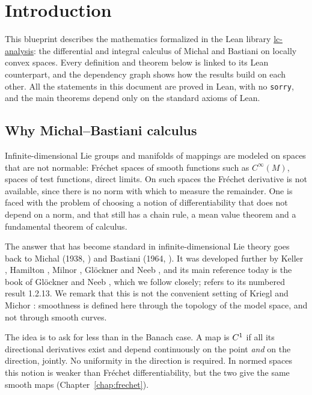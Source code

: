 \chapter{Introduction}
\label{chap:introduction}

This blueprint describes the mathematics formalized in the Lean library
\href{https://github.com/glaroton/lc-analysis}{lc-analysis}: the differential and integral
calculus of Michal and Bastiani on locally convex spaces. Every definition and theorem below is
linked to its Lean counterpart, and the dependency graph shows how the results build on each
other. All the statements in this document are proved in Lean, with no \texttt{sorry}, and the
main theorems depend only on the standard axioms of Lean.

\section*{Why Michal--Bastiani calculus}

Infinite-dimensional Lie groups and manifolds of mappings are modeled on spaces that are not
normable: Fréchet spaces of smooth functions such as $C^\infty(M)$, spaces of test functions,
direct limits. On such spaces the Fréchet derivative is not available, since there is no norm
with which to measure the remainder. One is faced with the problem of choosing a notion of
differentiability that does not depend on a norm, and that still has a chain rule, a mean value
theorem and a fundamental theorem of calculus.

The answer that has become standard in infinite-dimensional Lie theory goes back to Michal
(1938, \cite{Mic38}) and Bastiani (1964, \cite{Bas64}). It was developed further by Keller
\cite{Kel74}, Hamilton \cite{Ham82}, Milnor \cite{Mil84}, Glöckner \cite{Glo02} and Neeb
\cite{Nee06}, and its main reference today is the book of Glöckner and Neeb \cite{GN26}, which
we follow closely; \cite[1.2.13]{GN26} refers to its numbered result 1.2.13. We remark that
this is not the convenient setting of Kriegl and Michor \cite{KM97}: smoothness is defined here
through the topology of the model space, and not through smooth curves.

The idea is to ask for less than in the Banach case. A map is $C^{1}$ if all its directional
derivatives exist and depend continuously on the point \emph{and} on the direction, jointly. No
uniformity in the direction is required. In normed spaces this notion is weaker than Fréchet
differentiability, but the two give the same smooth maps (Chapter~\ref{chap:frechet}).

